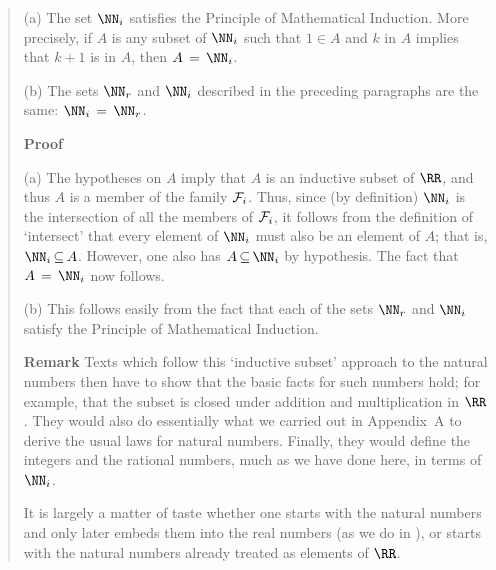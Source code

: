 {\begin{quotation}
{\V

\hspace*{\parindent}(a) The set ${\NN}_{i}$ satisfies the Principle of Mathematical Induction.
    More precisely, if $A$ is any subset of ${\NN}_{i}$ such that $1{\in}A$ and $k$ in $A$ implies that $k+1$ is in $A$, then $A \,=\, {\NN}_{i}$.

\V

        (b) The sets ${\NN}_{r}$ and ${\NN}_{i}$ described in the preceding paragraphs are the same: ${\NN}_{i} \,=\, {\NN}_{r}$.

\V

        {\bf Proof}

\V

        (a) The hypotheses on $A$ imply that $A$ is an inductive subset of ${\RR}$, and thus $A$ is a member of the family ${\cal F}_{i}$.
    Thus, since (by definition) ${\NN}_{i}$ is the intersection of all the members of ${\cal F}_{i}$,  it follows from the definition of `intersect' that every element of ${\NN}_{i}$ must also be an element of $A$; that is, ${\NN}_{i} \,{\subseteq}\, A$.
    However, one also has $A \,{\subseteq}\, {\NN}_{i}$ by hypothesis. The fact that $A \,=\, {\NN}_{i}$ now follows.

\V

        (b) This follows easily from the fact that each of the sets ${\NN}_{r}$ and ${\NN}_{i}$ satisfy the Principle of Mathematical Induction.

\V

        {\bf Remark} Texts which follow this `inductive subset' approach to the natural numbers then have to show that the basic facts for such numbers hold; 
    for example, that the subset is closed under addition and multiplication in ${\RR}$.
    They would also do essentially what we carried out in Appendix~A to derive the usual laws for natural numbers.
    Finally, they would define the integers and the rational numbers, much as we have done here, in terms of ${\NN}_{i}$.

        It is largely a matter of taste whether one starts with the natural numbers and only later embeds them into the real numbers (as we do in {\TheseNotes}),
    or starts with the natural numbers already treated as elements of ${\RR}$.
}%
\end{quotation} 
}%
